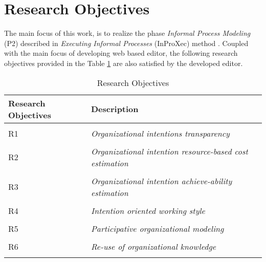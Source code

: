 \section {Research Objectives}
\label{sec:researchobjectives}
The main focus of this work, is to realize the phase \textit{Informal Process Modeling} (P2) described in \textit{Executing Informal Processes} (InProXec) method \cite{Sungur2015}. Coupled with the main focus of developing web based editor, the following research objectives provided in the Table \ref{tab:researchobjectives} are also satisfied by the developed editor. 

\label{sec:researchobj}
\begin{center}
	\begin{longtable}{p{5cm}p{11cm}} 
   	\toprule 
	\textbf{Research Objectives} & \textbf{Description} \\
	\midrule
	\endfirsthead
	\\
	R1 & \textit{Organizational intentions transparency}  \label{ro1} \\
	\\[-1.5ex]
	R2 & \textit{Organizational intention resource-based cost estimation}  \label{ro2} \\
	\\[-1.5ex]
	R3 & \textit{Organizational intention achieve-ability estimation} \label{ro3}\\
	\\[-1.5ex]
	R4 & \textit{Intention oriented working style}  \label{ro4}\\
	\\[-1.5ex]
	R5 & \textit{Participative organizational modeling}\label{ro5}\\
	\\[-1.5ex]
	R6 & \textit{Re-use of organizational knowledge} \label{ro6}\\	
	\bottomrule
	\caption{Research Objectives}
	\label{tab:researchobjectives}
	\end{longtable}	
\end{center}

